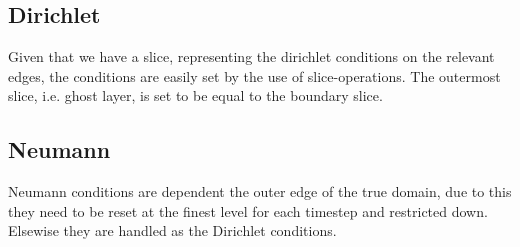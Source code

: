     \subsection{Dirichlet}
        Given that we have a slice, representing the dirichlet conditions on the relevant
        edges, the conditions are easily set by the use of slice-operations.
        The outermost slice, i.e. ghost layer, is set to be equal to the boundary slice.

    \subsection{Neumann}
		Neumann conditions are dependent the outer edge of the true domain, due to this they
		need to be reset at the finest level for each timestep and restricted down. Elsewise they are handled as
		the Dirichlet conditions.
